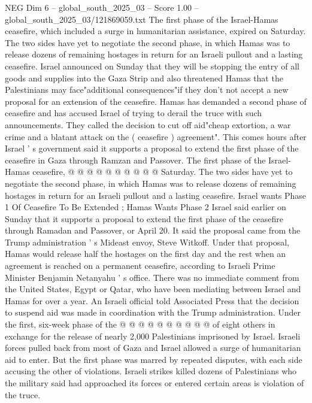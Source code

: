 \begin{textsample}{NEG Dim 6 – global\_south\_2025\_03 – Score 1.00 – global\_south\_2025\_03/121869059.txt}  \label{ex:f6_neg_219}
The first phase of the Israel-Hamas ceasefire, which included a surge in humanitarian assistance, expired on Saturday.
The two sides have yet to negotiate the second phase, in which Hamas was to release dozens of remaining hostages in return for an Israeli pullout and a lasting ceasefire.
Israel announced on Sunday that they will be stopping the entry of all goods and supplies into the Gaza Strip and also threatened Hamas that the Palestinians may face"additional consequences"if they don't not accept a new proposal for an extension of the ceasefire.
Hamas has demanded a second phase of ceasefire and has accused Israel of trying to derail the truce with such announcements.
They called the decision to cut off aid"cheap extortion, a war crime and a blatant attack on the ( ceasefire ) agreement".
This comes hours after Israel ' s government said it supports a proposal to extend the first phase of the ceasefire in Gaza through Ramzan and Passover.
The first phase of the Israel-Hamas ceasefire, @ @ @ @ @ @ @ @ @ @ Saturday.
The two sides have yet to negotiate the second phase, in which Hamas was to release dozens of remaining hostages in return for an Israeli pullout and a lasting ceasefire.
Israel wants Phase 1 Of Ceasefire To Be Extended ; Hamas Wants Phase 2 Israel said earlier on Sunday that it supports a proposal to extend the first phase of the ceasefire through Ramadan and Passover, or April 20.
It said the proposal came from the Trump administration ' s Mideast envoy, Steve Witkoff.
Under that proposal, Hamas would release half the hostages on the first day and the rest when an agreement is reached on a permanent ceasefire, according to Israeli Prime Minister Benjamin Netanyahu ' s office.
There was no immediate comment from the United States, Egypt or Qatar, who have been mediating between Israel and Hamas for over a year.
An Israeli official told Associated Press that the decision to suspend aid was made in coordination with the Trump administration.
Under the first, six-week phase of the @ @ @ @ @ @ @ @ @ @ of eight others in exchange for the release of nearly 2,000 Palestinians imprisoned by Israel.
Israeli forces pulled back from most of Gaza and Israel allowed a surge of humanitarian aid to enter.
But the first phase was marred by repeated disputes, with each side accusing the other of violations.
Israeli strikes killed dozens of Palestinians who the military said had approached its forces or entered certain areas is violation of the truce.

\end{textsample}

